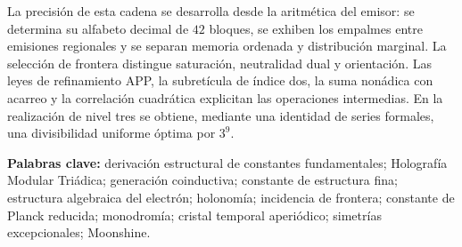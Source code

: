 \vspace{3pt}



La precisión de esta cadena se desarrolla desde la aritmética del emisor:
se determina su alfabeto decimal de \(42\) bloques, se exhiben los empalmes
entre emisiones regionales y se separan memoria ordenada y distribución
marginal. La selección de frontera distingue saturación, neutralidad dual
y orientación. Las leyes de refinamiento APP, la subretícula de índice
dos, la suma nonádica con acarreo y la correlación cuadrática explicitan
las operaciones intermedias. En la realización de nivel tres se obtiene,
mediante una identidad de series formales, una divisibilidad uniforme
óptima por \(3^9\).

\noindent\textbf{Palabras clave:} derivación estructural de constantes fundamentales;
Holografía Modular Triádica; generación coinductiva; constante de estructura fina;
estructura algebraica del electrón; holonomía; incidencia de frontera;
constante de Planck reducida; monodromía; cristal temporal aperiódico;
simetrías excepcionales; Moonshine.
\par\endgroup
